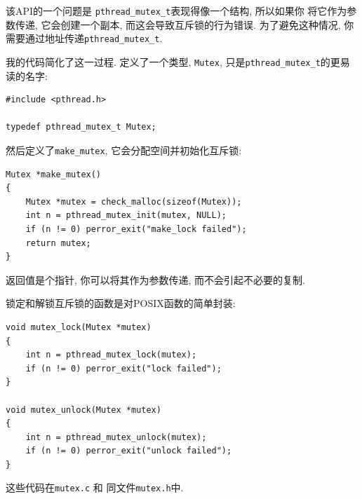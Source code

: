 \documentclass[12pt]{book}
\begin{document}
{%
该API的一个问题是 \verb"pthread_mutex_t"表现得像一个结构, 所以如果你
将它作为参数传递, 它会创建一个副本, 而这会导致互斥锁的行为错误. 
为了避免这种情况, 你需要通过地址传递\verb"pthread_mutex_t".

我的代码简化了这一过程. 定义了一个类型, {\tt Mutex},
只是\verb"pthread_mutex_t"的更易读的名字:

\begin{verbatim}
#include <pthread.h>

typedef pthread_mutex_t Mutex;
\end{verbatim}

然后定义了\verb"make_mutex", 它会分配空间并初始化互斥锁:

\begin{verbatim}
Mutex *make_mutex()
{
    Mutex *mutex = check_malloc(sizeof(Mutex));
    int n = pthread_mutex_init(mutex, NULL);
    if (n != 0) perror_exit("make_lock failed"); 
    return mutex;
}
\end{verbatim}

返回值是个指针, 你可以将其作为参数传递, 而不会引起不必要的复制.

锁定和解锁互斥锁的函数是对POSIX函数的简单封装:

\begin{verbatim}
void mutex_lock(Mutex *mutex)
{
    int n = pthread_mutex_lock(mutex);
    if (n != 0) perror_exit("lock failed");
}

void mutex_unlock(Mutex *mutex)
{
    int n = pthread_mutex_unlock(mutex);
    if (n != 0) perror_exit("unlock failed");
}
\end{verbatim}

这些代码在{\tt mutex.c} 和 同文件{\tt mutex.h}中. 

}
\end{document}
